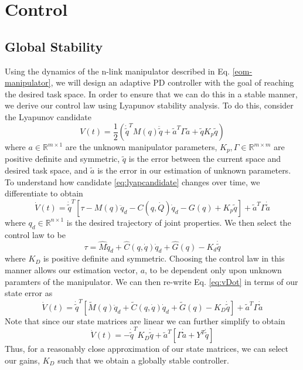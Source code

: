 \section{Control}
	\subsection{Global Stability}
		Using the dynamics of the n-link manipulator described in Eq. \ref{eom-manipulator}, we will design an adaptive PD controller with the goal of reaching the desired task space. In order to ensure that we can do this in a stable manner, we derive our control law using Lyapunov stability analysis. To do this, consider the Lyapunov candidate
		\begin{equation}
			V(t) = \frac{1}{2}\left(\dot{\tilde{q}}^{T}M(q)\ddot{\tilde{q}} + \tilde{a}^{T}\Gamma\tilde{a} + \tilde{q}K_{p}\tilde{q}\right)
			\label{eq:lyapcandidate}
		\end{equation}
		where $a\in\mathbb{R}^{m\times1}$ are the unknown manipulator parameters, $K_{p}, \Gamma\in\mathbb{R}^{m\times m}$ are positive definite and symmetric, $\tilde{q}$ is the error between the current space and desired task space, and $\tilde{a}$ is the error in our estimation of unknown parameters. To understand how candidate \ref{eq:lyapcandidate} changes over time, we differentiate to obtain
		\begin{equation}
			\dot{V}(t) = \dot{\tilde{q}}^{T}\left[ \tau - M(q)\ddot{q}_{d} - C(q,\dot{Q})\dot{q}_{d} - G(q) + K_{p}\tilde{q} \right] + \tilde{a}^{T}\Gamma\dot{\tilde{a}}
			\label{eq:vDot}
		\end{equation}
		where $q_{d}\in\mathbb{R}^{n\times1}$ is the desired trajectory of joint properties. We then select the control law to be
		\begin{equation}
			\tau = \hat{M}\ddot{q}_{d} + \hat{C}(q,\dot{q})\dot{q}_{d} + \hat{G}(q)	- K_{d}\dot{\tilde{q}}
			\label{eq:controlLaw}
		\end{equation}
		where $K_{D}$ is positive definite and symmetric. Choosing the control law in this manner allows our estimation vector, $a$, to be dependent only upon unknown paramters of the manipulator. We can then re-write Eq. \ref{eq:vDot} in terms of our state error as
		\begin{equation}
			\dot{V}(t) = \dot{\tilde{q}}^{T}\left[ \tilde{M}(q)\ddot{q}_{d} + \tilde{C}(q,\dot{q})\dot{q}_{d} + \tilde{G}(q) - K_{D}\dot{\tilde{q}} \right] + \tilde{a}^{T}\Gamma\dot{\tilde{a}}
			\label{eq:vDotControl}
		\end{equation}
		Note that since our state matrices are linear we can further simplify to obtain
		\begin{equation}
			\dot{V}(t) = -\dot{\tilde{q}}^{T}K_{D}\dot{\tilde{q}} + \tilde{a}^{T}\left[\Gamma\dot{\tilde{a}} + Y^{T}\dot{\tilde{q}} \right]
		\end{equation}
		Thus, for a reasonably close approximation of our state matrices, we can select our gains, $K_{D}$ such that we obtain a globally stable controller.
		
